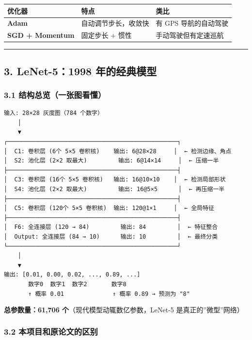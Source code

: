 \documentclass[
  11pt,
]{ctexart}
\newcounter{none} %
\begin{document}
{\def\LTcaptype{none} %
\begin{longtable}[]{@{}lll@{}}
\toprule\noalign{}
优化器 & 特点 & 类比 \\
\midrule\noalign{}
\endhead
\bottomrule\noalign{}
\endlastfoot
\textbf{Adam} & 自动调节步长，收敛快 & 有 GPS 导航的自动驾驶 \\
\textbf{SGD + Momentum} & 固定步长 + 惯性 & 手动驾驶但有定速巡航 \\
\end{longtable}
}

\begin{center}\rule{0.5\linewidth}{0.5pt}\end{center}

\subsection{3. LeNet-5：1998
年的经典模型}\label{lenet-51998-ux5e74ux7684ux7ecfux5178ux6a21ux578b}

\subsubsection{3.1
结构总览（一张图看懂）}\label{ux7ed3ux6784ux603bux89c8ux4e00ux5f20ux56feux770bux61c2}

\begin{verbatim}
输入: 28×28 灰度图（784 个数字）
    │
    ▼
┌─────────────────────────────────────────────────┐
│  C1: 卷积层 (6个 5×5 卷积核)    输出: 6@28×28     │  ← 检测边缘、角点
│  S2: 池化层 (2×2 取最大)         输出: 6@14×14     │  ← 压缩一半
├─────────────────────────────────────────────────┤
│  C3: 卷积层 (16个 5×5 卷积核)   输出: 16@10×10    │  ← 检测局部形状
│  S4: 池化层 (2×2 取最大)         输出: 16@5×5      │  ← 再压缩一半
├─────────────────────────────────────────────────┤
│  C5: 卷积层 (120个 5×5 卷积核)  输出: 120@1×1     │  ← 全局特征
├─────────────────────────────────────────────────┤
│  F6: 全连接层 (120 → 84)         输出: 84         │  ← 特征整合
│  Output: 全连接层 (84 → 10)      输出: 10         │  ← 最终分类
└─────────────────────────────────────────────────┘
    │
    ▼
输出: [0.01, 0.00, 0.02, ..., 0.89, ...]
       数字0  数字1  数字2       数字8
       ↑ 概率 0.01              ↑ 概率 0.89 → 预测为 "8"
\end{verbatim}

\textbf{总参数量：61,706 个}（现代模型动辄数亿参数，LeNet-5
是真正的”微型”网络）

\subsubsection{3.2
本项目和原论文的区别}\label{ux672cux9879ux76eeux548cux539fux8bbaux6587ux7684ux533aux522b}
\end{document}
